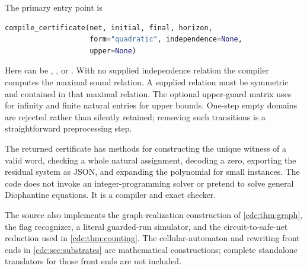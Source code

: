 \documentclass[11pt,a4paper]{article}
\theoremstyle{definition}
\theoremstyle{remark}
\newcommand{\code}[1]{\texttt{\detokenize{#1}}}
\begin{document}
The primary entry point is
\begin{lstlisting}[language=Python]
compile_certificate(net, initial, final, horizon,
                    form="quadratic", independence=None,
                    upper=None)
\end{lstlisting}
Here \code{form} can be \code{raw}, \code{quartic}, or \code{quadratic}. With no supplied independence relation the compiler computes the maximal sound relation. A supplied relation must be symmetric and contained in that maximal relation. The optional upper-guard matrix uses \code{None} for infinity and finite natural entries for upper bounds. One-step empty domains are rejected rather than silently retained; removing such transitions is a straightforward preprocessing step.

The returned certificate has methods for constructing the unique witness of a valid word, checking a whole natural assignment, decoding a zero, exporting the residual system as JSON, and expanding the polynomial for small instances. The code does not invoke an integer-programming solver or pretend to solve general Diophantine equations. It is a compiler and exact checker.

The source also implements the graph-realization construction of \cref{cdc:thm:graph}, the flag recognizer, a literal guarded-run simulator, and the circuit-to-safe-net reduction used in \cref{cdc:thm:counting}. The cellular-automaton and rewriting front ends in \cref{cdc:sec:substrates} are mathematical constructions; complete standalone translators for those front ends are not included.
\end{document}
